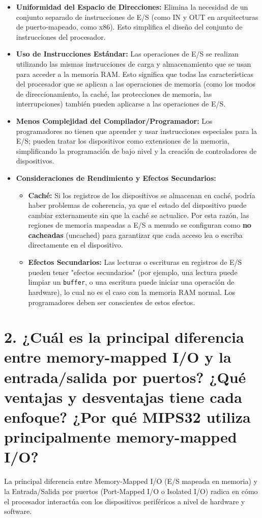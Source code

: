 \documentclass[12pt, a4paper]{article}
\begin{document}
\begin{itemize}
    \item \textbf{Uniformidad del Espacio de Direcciones:} Elimina la necesidad de un conjunto separado de instrucciones de E/S (como IN y OUT en arquitecturas de puerto-mapeado, como x86). Esto simplifica el diseño del conjunto de instrucciones del procesador.
    \item \textbf{Uso de Instrucciones Estándar:} Las operaciones de E/S se realizan utilizando las mismas instrucciones de carga y almacenamiento que se usan para acceder a la memoria RAM. Esto significa que todas las características del procesador que se aplican a las operaciones de memoria (como los modos de direccionamiento, la caché, las protecciones de memoria, las interrupciones) también pueden aplicarse a las operaciones de E/S.
    \item \textbf{Menos Complejidad del Compilador/Programador:} Los programadores no tienen que aprender y usar instrucciones especiales para la E/S; pueden tratar los dispositivos como extensiones de la memoria, simplificando la programación de bajo nivel y la creación de controladores de dispositivos.
    \item \textbf{Consideraciones de Rendimiento y Efectos Secundarios:}
    \begin{itemize}
        \item \textbf{Caché:} Si los registros de los dispositivos se almacenan en caché, podría haber problemas de coherencia, ya que el estado del dispositivo puede cambiar externamente sin que la caché se actualice. Por esta razón, las regiones de memoria mapeadas a E/S a menudo se configuran como \textbf{no cacheadas} (uncached) para garantizar que cada acceso lea o escriba directamente en el dispositivo.
        \item \textbf{Efectos Secundarios:} Las lecturas o escrituras en registros de E/S pueden tener "efectos secundarios" (por ejemplo, una lectura puede limpiar un \texttt{buffer}, o una escritura puede iniciar una operación de hardware), lo cual no es el caso con la memoria RAM normal. Los programadores deben ser conscientes de estos efectos.
    \end{itemize}
\end{itemize}

\section*{2. ¿Cuál es la principal diferencia entre memory-mapped I/O y la entrada/salida por puertos? ¿Qué ventajas y desventajas tiene cada enfoque? ¿Por qué MIPS32 utiliza principalmente memory-mapped I/O?}
La principal diferencia entre Memory-Mapped I/O (E/S mapeada en memoria) y la Entrada/Salida por puertos (Port-Mapped I/O o Isolated I/O) radica en cómo el procesador interactúa con los dispositivos periféricos a nivel de hardware y software.
\end{document}
